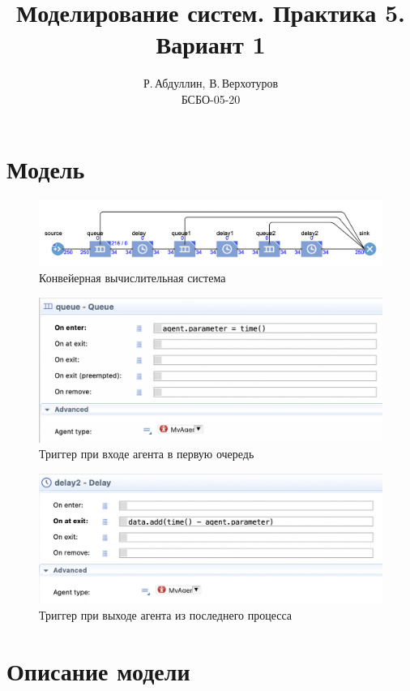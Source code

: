 \documentclass[14pt, a4paper, titlepage]{extarticle}
\title{Моделирование систем. Практика 5. Вариант 1}
\author{Р.\,Абдуллин, В.\,Верхотуров \\  БСБО-05-20}
\affil{РТУ МИРЭА}
\begin{document}
	\maketitle
	
	\section{Модель}
	
	\begin{figure}[H]
		\includegraphics[width=.9\textwidth]{model}
		\caption{Конвейерная вычислительная система}
	\end{figure}

	\begin{figure}[H]
		\includegraphics[width=.9\textwidth]{code1}
		\caption{Триггер при входе агента в первую очередь}
	\end{figure}

	\begin{figure}[H]
		\includegraphics[width=.9\textwidth]{code2}
		\caption{Триггер при выходе агента из последнего процесса}
	\end{figure}
	
	\section{Описание модели}
	
\end{document}
